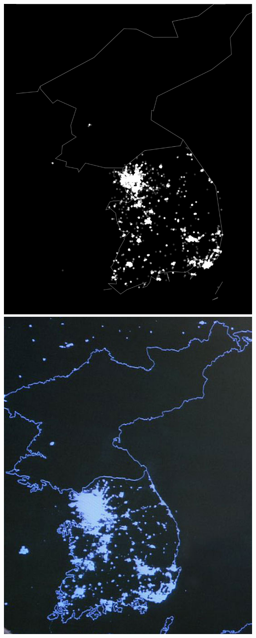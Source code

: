 \documentclass{beamer}
\begin{document}
\begin{frame}
	
	\begin{columns}
		\column{1.7in}
		\includegraphics[width=1.2\textwidth]{figures/tweets_korea.png}
		\column{1.7in}
		\includegraphics[width=1.2\textwidth]{figures/korea_lights.jpg}

\end{columns}
\end{frame}
\end{document}
